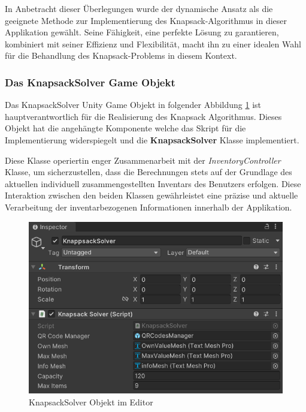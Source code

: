 In Anbetracht dieser Überlegungen wurde der dynamische Ansatz als die geeignete Methode zur Implementierung des Knapsack-Algorithmus
in dieser Applikation gewählt. Seine Fähigkeit, eine perfekte Lösung zu garantieren, kombiniert mit seiner Effizienz und
Flexibilität, macht ihn zu einer idealen Wahl für die Behandlung des Knapsack-Problems in diesem Kontext.

\subsubsection{Das KnapsackSolver Game Objekt}
Das KnapsackSolver Unity Game Objekt in folgender Abbildung \ref{fig:Knapsack_Editor} ist hauptverantwortlich für die
Realisierung des Knapsack Algorithmus. Dieses Objekt hat die angehängte Komponente  welche das
Skript für die Implementierung widerspiegelt und die \textbf{KnapsackSolver} Klasse implementiert.

Diese Klasse operiertin enger Zusammenarbeit mit der \textit{InventoryController} Klasse, um sicherzustellen, dass die
Berechnungen stets auf der Grundlage des aktuellen individuell zusammengestellten Inventars des Benutzers erfolgen. Diese
Interaktion zwischen den beiden Klassen gewährleistet eine präzise und aktuelle Verarbeitung der inventarbezogenen
Informationen innerhalb der Applikation.\\

\begin{figure}[H]
    \centering
    \includegraphics[scale=0.8]{images/knapsackEditor}
    \caption{KnapsackSolver Objekt im Editor}
    \label{fig:Knapsack_Editor}
\end{figure}

